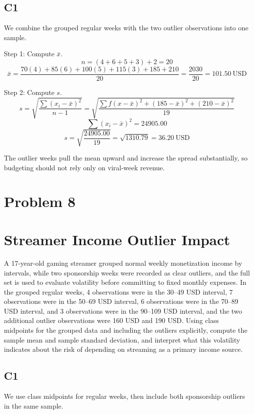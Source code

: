 \begin{ExamProblems}
		\subsection*{C1}
		We combine the grouped regular weeks with the two outlier observations into one sample.

		Step 1: Compute $\bar{x}$.
		\[
		n = (4+6+5+3)+2 = 20
		\]
		\[
		\bar{x} = \frac{70(4)+85(6)+100(5)+115(3)+185+210}{20}
		= \frac{2030}{20}
		= 101.50\ \text{USD}
		\]

		Step 2: Compute $s$.
		\[
		s = \sqrt{\frac{\sum (x_i-\bar{x})^2}{n-1}}
		= \sqrt{\frac{\sum f(x-\bar{x})^2 + (185-\bar{x})^2 + (210-\bar{x})^2}{19}}
		\]
		\[
		\sum (x_i-\bar{x})^2 = 24905.00
		\]
		\[
		s = \sqrt{\frac{24905.00}{19}} = \sqrt{1310.79} = 36.20\ \text{USD}
		\]

		The outlier weeks pull the mean upward and increase the spread substantially, so budgeting should not rely only on viral-week revenue.

		\newpage
		\item
		\section{Problem 8}
		\section{Streamer Income Outlier Impact}
		A 17-year-old gaming streamer grouped normal weekly monetization income by intervals, while two sponsorship weeks were recorded as clear outliers, and the full set is used to evaluate volatility before committing to fixed monthly expenses. In the grouped regular weeks, 4 observations were in the 30--49 USD interval, 7 observations were in the 50--69 USD interval, 6 observations were in the 70--89 USD interval, and 3 observations were in the 90--109 USD interval, and the two additional outlier observations were 160 USD and 190 USD. Using class midpoints for the grouped data and including the outliers explicitly, compute the sample mean and sample standard deviation, and interpret what this volatility indicates about the risk of depending on streaming as a primary income source.

		\subsection*{C1}
		We use class midpoints for regular weeks, then include both sponsorship outliers in the same sample.


\end{ExamProblems}
